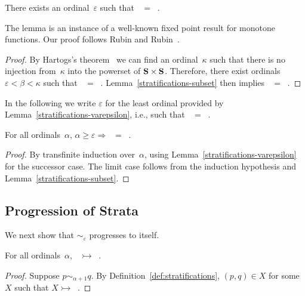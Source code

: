 \documentclass{CSML}
\theoremstyle{definition}
\newcommand{\progress}{\rightarrowtail}
\begin{document}
\begin{lem}
\label{stratifications-varepsilon}
There exists an ordinal~$\varepsilon$ such that
$\mathop{\sim_{\varepsilon+1}} = \mathop{\sim_\varepsilon}$.
\end{lem}

The lemma is an instance of a well-known fixed point result for
monotone functions.  Our proof follows Rubin and
Rubin~\cite{Rubin1963}.

\begin{proof}
By Hartogs's theorem~\cite{Hartogs1915} we can find an
ordinal~$\kappa$ such that there is no injection from~$\kappa$ into
the powerset of ${\bf S} \times {\bf S}$.  Therefore, there exist
ordinals $\varepsilon < \beta < \kappa$ such that
$\mathop{\sim_{\varepsilon}} = \mathop{\sim_\beta}$.
Lemma~\ref{stratifications-subset} then implies
$\mathop{\sim_{\varepsilon+1}} = \mathop{\sim_\varepsilon}$.
\end{proof}

In the following we write $\varepsilon$ for the least ordinal provided
by Lemma~\ref{stratifications-varepsilon}, i.e., such that
$\mathop{\sim_{\varepsilon+1}} = \mathop{\sim_\varepsilon}$.

\begin{lem}
\label{stratifications-stable}
For all ordinals~$\alpha$, $\alpha \geq \varepsilon \Longrightarrow
\mathop{\sim_\alpha} = \mathop{\sim_\varepsilon}$.
\end{lem}

\begin{proof}
By transfinite induction over~$\alpha$, using
Lemma~\ref{stratifications-varepsilon} for the successor case.  The
limit case follows from the induction hypothesis and
Lemma~\ref{stratifications-subset}.
\end{proof}

\subsection{Progression of Strata}

We next show that $\sim_\varepsilon$ progresses to itself.

\begin{lem}
\label{stratifications-progress}
For all ordinals~$\alpha$, $\mathop{\sim_{\alpha+1}} \progress
\mathop{\sim_\alpha}$.
\end{lem}

\begin{proof}
Suppose $p \sim_{\alpha+1} q$.  By
Definition~\ref{def:stratifications}, $(p,q) \in X$ for some~$X$ such
that $X \progress \mathop{\sim_\alpha}$.
\end{proof}
\end{document}
